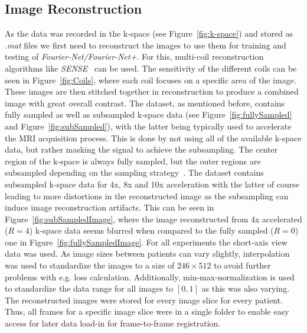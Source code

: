 \documentclass[english,version-2022-01]{uzl-thesis} %
\begin{document}
\subsection{Image Reconstruction} \label{SubSec:ImageReconstruction}
As the data was recorded in the k-space (see Figure~\ref{fig:k-space}) and stored as \emph{.mat} files we first need to reconstruct the images to use them for training and testing of \emph{Fourier-Net/Fourier-Net+}. For this, multi-coil reconstruction algorithms like \emph{SENSE}~\cite{SENSE1} can be used. The sensitivity of the different coils can be seen in Figure~\ref{fig:Coils}, where each coil focuses on a specific area of the image. These images are then stitched together in reconstruction to produce a combined image with great overall contrast.
The dataset, as mentioned before, contains fully sampled as well as subsampled k-space data (see Figure~\ref{fig:fullySampled} and Figure~\ref{fig:subSampled}), with the latter being typically used to accelerate the MRI acquisition process. This is done by not using all of the available k-space data, but rather masking the signal to achieve the subsampling. The center region of the k-space is always fully sampled, but the outer regions are subsampled depending on the sampling strategy~\cite{SamplingStrategies}. The dataset contains subsampled k-space data for 4x, 8x and 10x acceleration with the latter of course leading to more distortions in the reconstructed image as the subsampling can induce image reconstruction artifacts. This can be seen in Figure~\ref{fig:subSampledImage}, where the image reconstructed from 4x accelerated ($R=4$) k-space data seems blurred when compared to the fully sampled ($R=0$) one in Figure~\ref{fig:fullySampledImage}. 
For all experiments the short-axis  view data was used. As image sizes between patients can vary slightly, interpolation was used to standardize the images to a size of $246 \times 512$ to avoid further problems with e.g. 
loss calculation. Additionally, min-max-normalization is used to standardize the data range for all images to $[0,1]$ as this was also varying. The reconstructed images were stored for every image slice for every patient. Thus, all frames for a specific image slice were in a single folder to enable easy access for later data load-in for frame-to-frame registration.
\end{document}
